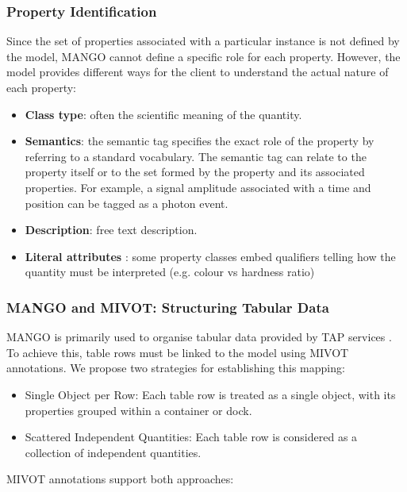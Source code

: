 \documentclass[11pt,a4paper]{ivoa}
\begin{document}
\subsubsection{Property Identification}
Since the set of properties associated with a particular instance is not defined by the model,
MANGO cannot define a specific role for each property. However, the model provides different ways
for the client to understand the actual nature of each property:

\begin{itemize}[noitemsep,topsep=0pt,parsep=0pt,partopsep=0pt]
    \item \textbf{Class type}: often the scientific meaning of the quantity.
    \item \textbf{Semantics}: the semantic tag specifies the exact role of the property by
          referring to a standard vocabulary. The semantic tag can relate to the property itself
          or to the set formed by the property and its associated properties.
          For example, a signal amplitude associated with a time and position can be tagged
          as a photon event.
    \item \textbf{Description}: free text description.
    \item \textbf{Literal attributes} : some property classes embed qualifiers telling 
          how the quantity must be interpreted (e.g. colour vs hardness ratio)
\end{itemize}


\subsubsection{MANGO and MIVOT: Structuring Tabular Data}

MANGO is primarily used to organise tabular data provided by TAP services \citep{2019ivoa.spec.0927D}.
To achieve this, table rows must be linked to the model using MIVOT annotations.
We propose two strategies for establishing this mapping:
\begin{itemize}[noitemsep,topsep=0pt,parsep=0pt,partopsep=0pt]
    \item Single Object per Row: Each table row is treated as a single object,
          with its properties grouped within a container or dock.
    \item Scattered Independent Quantities: Each table row is considered as a collection of independent quantities.
\end{itemize}

MIVOT annotations support both approaches:
\end{document}
